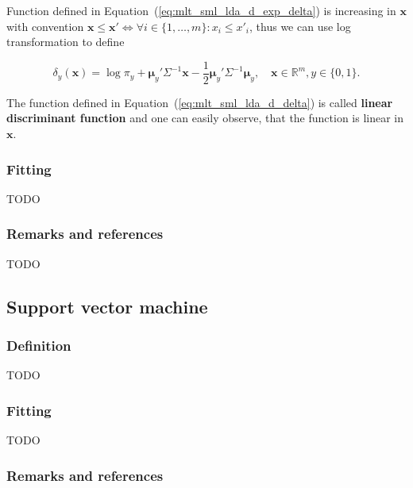 \documentclass[12pt, a4paper]{report}
\newcommand{\R}{\mathbb{R}}
\theoremstyle{plain}
\theoremstyle{plain}
\theoremstyle{remark}
\begin{document}
Function defined in Equation~(\ref{eq:mlt_sml_lda_d_exp_delta}) is increasing in $\pmb{x}$ with convention $\pmb{x}\leq \pmb{x}'\Leftrightarrow \forall i \in\{1,\ldots,m\}: x_i\leq x'_i$, thus we can use log transformation to define

\begin{equation}
\label{eq:mlt_sml_lda_d_delta}
\delta_y(\pmb{x}) = \log \pi_y + \pmb{\mu}_y'\Sigma^{-1}\pmb{x} - \frac{1}{2}\pmb{\mu}_y'\Sigma^{-1}\pmb{\mu}_y,\quad \pmb{x}\in\R^m, y\in\{0,1\}.
\end{equation}

The function defined in Equation~(\ref{eq:mlt_sml_lda_d_delta}) is called \textbf{linear discriminant function} and one can easily observe, that the function is linear in $\pmb{x}$.
\subsubsection{Fitting}
\label{subsubsec:mlt_sml_lda_fitting}

TODO

\subsubsection{Remarks and references}
\label{subsubsec:mlt_sml_lda_remarks_and_references}

TODO

\subsection{Support vector machine}
\label{subsec:mlt_sml_support_vector_machine}

\subsubsection{Definition}
\label{subsubsec:mlt_sml_svm_definition}

TODO

\subsubsection{Fitting}
\label{subsubsec:mlt_sml_svm_fitting}

TODO

\subsubsection{Remarks and references}
\label{subsubsec:mlt_sml_svm_remarks_and_references}
\end{document}
